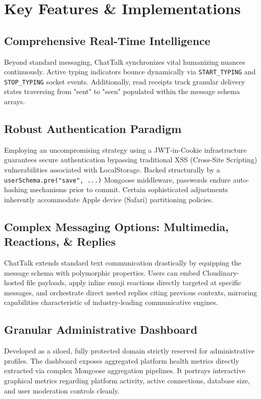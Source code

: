 \documentclass[12pt,a4paper]{article}
\begin{document}
\section{Key Features \& Implementations}

\subsection{Comprehensive Real-Time Intelligence}
Beyond standard messaging, ChatTalk synchronizes vital humanizing nuances continuously. Active typing indicators bounce dynamically via \texttt{START\_TYPING} and \texttt{STOP\_TYPING} socket events. Additionally, read receipts track granular delivery states traversing from "sent" to "seen" populated within the message schema arrays.

\subsection{Robust Authentication Paradigm}
Employing an uncompromising strategy using a JWT-in-Cookie infrastructure guarantees secure authentication bypassing traditional XSS (Cross-Site Scripting) vulnerabilities associated with LocalStorage. Backed structurally by a \texttt{userSchema.pre("save", ...)} Mongoose middleware, passwords endure auto-hashing mechanisms prior to commit. Certain sophisticated adjustments inherently accommodate Apple device (Safari) partitioning policies.

\subsection{Complex Messaging Options: Multimedia, Reactions, \& Replies}
ChatTalk extends standard text communication drastically by equipping the message schema with polymorphic properties. Users can embed Cloudinary-hosted file payloads, apply inline emoji reactions directly targeted at specific messages, and orchestrate direct nested replies citing previous contexts, mirroring capabilities characteristic of industry-leading communicative engines.

\subsection{Granular Administrative Dashboard}
Developed as a siloed, fully protected domain strictly reserved for administrative profiles. The dashboard exposes aggregated platform health metrics directly extracted via complex Mongoose aggregation pipelines. It portrays interactive graphical metrics regarding platform activity, active connections, database size, and user moderation controls cleanly.
\end{document}
